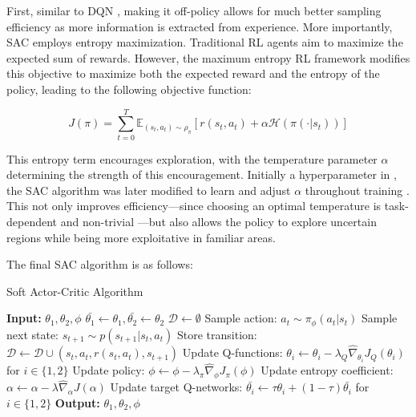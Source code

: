 First, similar to DQN \cite{mnihPlayingAtariDeep2013, mnihHumanlevelControlDeep2015}, making it off-policy allows for much better sampling efficiency as more information is extracted from experience. More importantly, SAC employs entropy maximization. Traditional RL agents aim to maximize the expected sum of rewards. However, the maximum entropy RL framework modifies this objective to maximize both the expected reward and the entropy of the policy, leading to the following objective function:

\begin{equation}
J(\pi) = \sum_{t=0}^{T} \mathbb{E}_{(s_{t}, a_{t}) \sim \rho_{\pi}} \left[ r(s_{t}, a_{t}) + \alpha \mathcal{H}(\pi(\cdot|s_{t})) \right] 
\end{equation}

This entropy term encourages exploration, with the temperature parameter $\alpha$ determining the strength of this encouragement. Initially a hyperparameter in \cite{haarnojaSoftActorCriticOffPolicy2018}, the SAC algorithm was later modified to learn and adjust $\alpha$ throughout training \cite{haarnojaSoftActorCriticAlgorithms2019}. This not only improves efficiency—since choosing an optimal temperature is task-dependent and non-trivial \cite{haarnojaSoftActorCriticAlgorithms2019}—but also allows the policy to explore uncertain regions while being more exploitative in familiar areas.

The final SAC algorithm \cite{haarnojaSoftActorCriticAlgorithms2019} is as follows:

\begin{algorithm}[H]
\caption{Soft Actor-Critic Algorithm}
\begin{algorithmic}[1]
\State \textbf{Input:} $\theta_{1}, \theta_{2}, \phi$
\State $\bar{\theta_{1}} \gets \theta_{1}, \bar{\theta_{2}} \gets \theta_{2}$
\State $\mathcal{D} \gets \emptyset$
        \State Sample action: $a_{t} \sim \pi_{\phi}(a_{t} | s_{t})$
        \State Sample next state: $s_{t+1} \sim p(s_{t+1} | s_{t}, a_{t})$
        \State Store transition: $\mathcal{D} \gets \mathcal{D} \cup (s_{t}, a_{t}, r(s_{t}, a_{t}), s_{t+1})$
    \EndFor
        \State Update Q-functions: $\theta_{i} \gets \theta_{i} - \lambda_{Q} \hat{\nabla}_{\theta_{i}} J_{Q}(\theta_{i})$ for $i \in \{1,2\}$
        \State Update policy: $\phi \gets \phi - \lambda_{\pi} \hat{\nabla}_{\phi} J_{\pi}(\phi)$
        \State Update entropy coefficient: $\alpha \gets \alpha - \lambda \hat{\nabla}_{\alpha} J(\alpha)$
        \State Update target Q-networks: $\bar{\theta_{i}} \gets \tau\theta_{i} + (1 - \tau) \bar{\theta_{i}}$ for $i \in \{1,2\}$
    \EndFor
\EndFor
\State \textbf{Output:} $\theta_{1}, \theta_{2}, \phi$
\end{algorithmic}
\end{algorithm}

